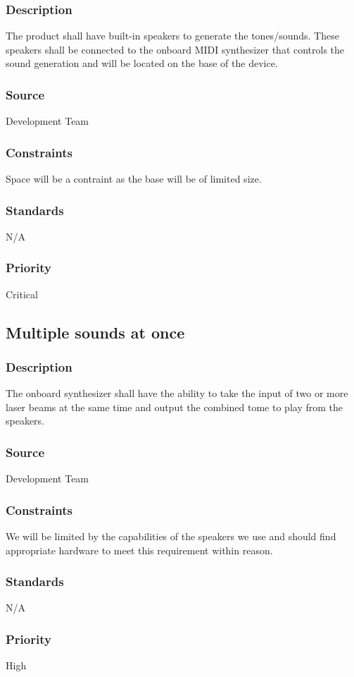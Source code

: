 \subsubsection{Description}
The product shall have built-in speakers to generate the tones/sounds. These speakers shall be connected to the onboard MIDI synthesizer that controls the sound generation and will be located on the base of the device.
\subsubsection{Source}
Development Team
\subsubsection{Constraints}
Space will be a contraint as the base will be of limited size.
\subsubsection{Standards}
N/A
\subsubsection{Priority}
Critical

\subsection{Multiple sounds at once}
\subsubsection{Description}
The onboard synthesizer shall have the ability to take the input of two or more laser beams at the same time and output the combined tome to play from the speakers.  
\subsubsection{Source}
Development Team
\subsubsection{Constraints}
We will be limited by the capabilities of the speakers we use and should find appropriate hardware to meet this requirement within reason.
\subsubsection{Standards}
N/A
\subsubsection{Priority}
High


